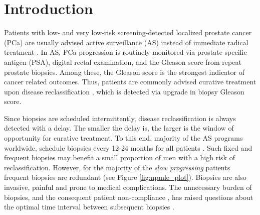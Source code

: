 \section{Introduction}

Patients with low- and very low-risk screening-detected localized prostate cancer (PCa) are usually advised active surveillance (AS) instead of immediate radical treatment \citep{briganti2018active}. In AS, PCa progression is routinely monitored via prostate-specific antigen (PSA), digital rectal examination, and the Gleason score from repeat prostate biopsies. Among these, the Gleason score is the strongest indicator of cancer related outcomes. Thus, patients are commonly advised curative treatment upon disease reclassification \citep{bul2013active}, which is detected via upgrade in biopsy Gleason score.

Since biopsies are scheduled intermittently, disease reclassification is always detected with a delay. The smaller the delay is, the larger is the window of opportunity for curative treatment. To this end, majority of the AS programs worldwide, schedule biopsies every 12-24 months for all patients \citep{nieboer2018active,loeb2014heterogeneity}. Such fixed and frequent biopsies may benefit a small proportion of men with a high risk of reclassification. However, for the majority of the \textit{slow progressing} patients frequent biopsies are redundant (see Figure \ref{fig:npmle_plot}). Biopsies are also invasive, painful and prone to medical complications. The unnecessary burden of biopsies, and the consequent patient non-compliance \citep{bokhorst2015compliance}, has raised questions about the optimal time interval between subsequent biopsies \citep{inoue2018comparative, bratt2013study}.

